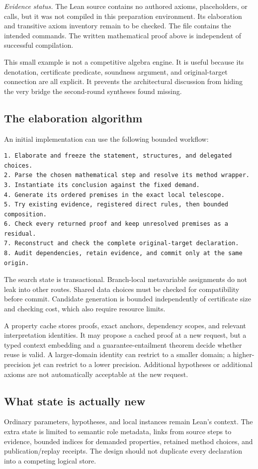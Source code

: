 \documentclass[11pt,a4paper]{article}
\newcommand{\code}[1]{\texttt{\detokenize{#1}}}
\newcommand{\status}[1]{\par\smallskip\textit{Evidence status.} #1\par\smallskip}
\theoremstyle{definition}
\begin{document}
\status{The Lean source contains no authored axioms, \code{sorry} placeholders,
or \code{native_decide} calls, but it was not compiled in this preparation
environment. Its elaboration and transitive axiom inventory remain to be
checked. The file contains the intended \code{#print axioms} commands. The
written mathematical proof above is independent of successful compilation.}

This small example is not a competitive algebra engine. It is useful because
its denotation, certificate predicate, soundness argument, and original-target
connection are all explicit. It prevents the architectural discussion from
hiding the very bridge the second-round syntheses found missing.

\subsection{The elaboration algorithm}
An initial implementation can use the following bounded workflow:
\begin{lstlisting}
1. Elaborate and freeze the statement, structures, and delegated choices.
2. Parse the chosen mathematical step and resolve its method wrapper.
3. Instantiate its conclusion against the fixed demand.
4. Generate its ordered premises in the exact local telescope.
5. Try existing evidence, registered direct rules, then bounded composition.
6. Check every returned proof and keep unresolved premises as a residual.
7. Reconstruct and check the complete original-target declaration.
8. Audit dependencies, retain evidence, and commit only at the same origin.
\end{lstlisting}

The search state is transactional. Branch-local metavariable assignments do not
leak into other routes. Shared data choices must be checked for compatibility
before commit. Candidate generation is bounded independently of certificate
size and checking cost, which also require resource limits.

A property cache stores proofs, exact anchors, dependency scopes, and relevant
interpretation identities. It may propose a cached proof at a new request, but
a typed context embedding and a guarantee-entailment theorem decide whether
reuse is valid. A larger-domain identity can restrict to a smaller domain; a
higher-precision jet can restrict to a lower precision. Additional hypotheses
or additional axioms are not automatically acceptable at the new request.

\subsection{What state is actually new}
Ordinary parameters, hypotheses, and local instances remain Lean's context.
The extra state is limited to semantic role metadata, links from source steps
to evidence, bounded indices for demanded properties, retained method choices,
and publication/replay receipts. The design should not duplicate every
\code{have} declaration into a competing logical store.
\end{document}
